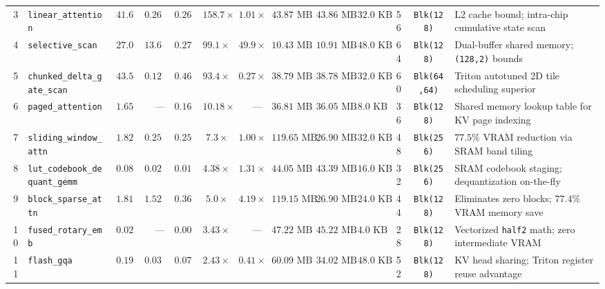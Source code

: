 \begin{table}[t]
{\begin{tabular}{rlrrrrrrrcccp{4.2cm}}
3  & \texttt{linear\_attention}            & $41.680$ & $0.266$  & $0.263$ & $\mathbf{158.7\times}$  & $1.01\times$ & $43.87\text{ MB}$ & $43.86\text{ MB}$ & $32.0\text{ KB}$ & 56 & \texttt{Blk(128)}  & L2 cache bound; intra-chip cumulative state scan \\
4  & \texttt{selective\_scan}             & $27.095$ & $13.648$ & $0.273$ & $\mathbf{99.1\times}$   & $\mathbf{49.9\times}$ & $10.43\text{ MB}$ & $10.91\text{ MB}$ & $48.0\text{ KB}$ & 64 & \texttt{Blk(128)}  & Dual-buffer shared memory; \texttt{(128,2)} bounds \\
5  & \texttt{chunked\_delta\_gate\_scan}   & $43.506$ & $0.127$  & $0.466$ & $93.4\times$            & $0.27\times$ & $38.79\text{ MB}$ & $38.78\text{ MB}$ & $32.0\text{ KB}$ & 60 & \texttt{Blk(64,64)}& Triton autotuned 2D tile scheduling superior \\
6  & \texttt{paged\_attention}            & $1.654$  & ---      & $0.1625$& $\mathbf{10.18\times}$  & ---          & $36.81\text{ MB}$ & $36.05\text{ MB}$ & $8.0\text{ KB}$  & 36 & \texttt{Blk(128)}  & Shared memory lookup table for KV page indexing \\
7  & \texttt{sliding\_window\_attn}        & $1.822$  & $0.252$  & $0.251$ & $7.3\times$             & $1.00\times$ & $119.65\text{ MB}$& $26.90\text{ MB}$ & $32.0\text{ KB}$ & 48 & \texttt{Blk(256)}  & $77.5\%$ VRAM reduction via SRAM band tiling \\
8  & \texttt{lut\_codebook\_dequant\_gemm} & $0.084$  & $0.025$  & $0.019$ & $4.38\times$            & $1.31\times$ & $44.05\text{ MB}$ & $43.39\text{ MB}$ & $16.0\text{ KB}$ & 32 & \texttt{Blk(256)}  & SRAM codebook staging; dequantization on-the-fly \\
9  & \texttt{block\_sparse\_attn}          & $1.816$  & $1.526$  & $0.364$ & $5.0\times$             & $4.19\times$ & $119.15\text{ MB}$& $26.90\text{ MB}$ & $24.0\text{ KB}$ & 44 & \texttt{Blk(128)}  & Eliminates zero blocks; $77.4\%$ VRAM memory save \\
10 & \texttt{fused\_rotary\_emb}           & $0.028$  & ---      & $0.008$ & $3.43\times$            & ---          & $47.22\text{ MB}$ & $45.22\text{ MB}$ & $4.0\text{ KB}$  & 28 & \texttt{Blk(128)}  & Vectorized \texttt{half2} math; zero intermediate VRAM \\
11 & \texttt{flash\_gqa}                   & $0.192$  & $0.032$  & $0.079$ & $2.43\times$            & $0.41\times$ & $60.09\text{ MB}$ & $34.02\text{ MB}$ & $48.0\text{ KB}$ & 52 & \texttt{Blk(128)}  & KV head sharing; Triton register reuse advantage \\

\end{tabular}}
\end{table}
